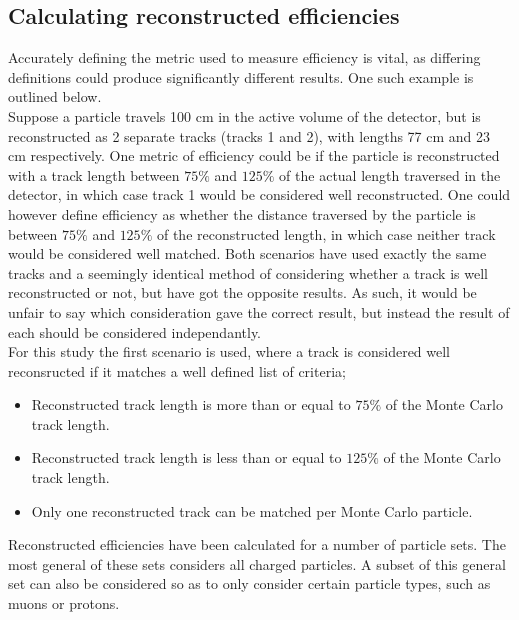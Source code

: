 \documentclass[11pt]{report} %
\begin{document}
{\subsection{Calculating reconstructed efficiencies}
Accurately defining the metric used to measure efficiency is vital, as differing definitions could produce significantly different results. One such example is outlined below. \\

Suppose a particle travels 100 cm in the active volume of the detector, but is reconstructed as 2 separate tracks (tracks 1 and 2), with lengths 77 cm and 23 cm respectively. One metric of efficiency could be if the particle is reconstructed with a track length between \( 75\% \) and \( 125\% \) of the actual length traversed in the detector, in which case track 1 would be considered well reconstructed. One could however define efficiency as whether the distance traversed by the particle is between \( 75\% \) and \( 125\% \) of the reconstructed length, in which case neither track would be considered well matched. Both scenarios have used exactly the same tracks and a seemingly identical method of considering whether a track is well reconstructed or not, but have got the opposite results. As such, it would be unfair to say which consideration gave the correct result, but instead the result of each should be considered independantly. \\

For this study the first scenario is used, where a track is considered well reconsructed if it matches a well defined list of criteria;
\begin{itemize}
\item Reconstructed track length is more than or equal to \( 75\% \) of the Monte Carlo track length.
\item Reconstructed track length is less than or equal to \( 125\% \) of the Monte Carlo track length.
\item Only one reconstructed track can be matched per Monte Carlo particle.
\end{itemize}
Reconstructed efficiencies have been calculated for a number of particle sets. The most general of these sets considers all charged particles. A subset of this general set can also be considered so as to only consider certain particle types, such as muons or protons. \\

}
\end{document}
